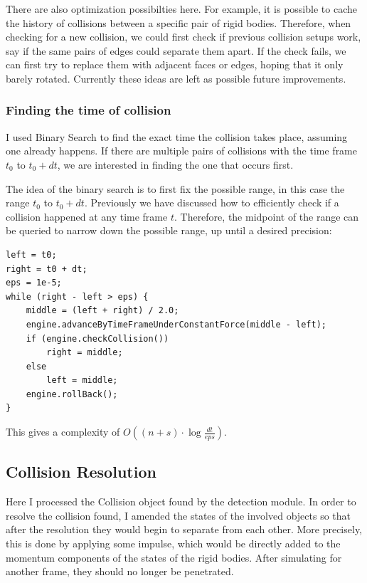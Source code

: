\documentclass[12pt,a4paper,twoside,openright]{report}
\begin{document}
There are also optimization possibilties here. For example, it is possible to cache the history of collisions between a specific pair of rigid bodies. Therefore, when checking for a new collision, we could first check if previous collision setups work, say if the same pairs of edges could separate them apart. If the check fails, we can first try to replace them with adjacent faces or edges, hoping that it only barely rotated. Currently these ideas are left as possible future improvements.

\subsubsection{Finding the time of collision}

I used Binary Search to find the exact time the collision takes place, assuming one already happens. If there are multiple pairs of collisions with the time frame $t_0$ to $t_0 + dt$, we are interested in finding the one that occurs first.

The idea of the binary search is to first fix the possible range, in this case the range $t_0$ to $t_0 + dt$. Previously we have discussed how to efficiently check if a collision happened at any time frame $t$. Therefore, the midpoint of the range can be queried to narrow down the possible range, up until a desired precision:

\begin{verbatim}
left = t0;
right = t0 + dt;
eps = 1e-5;
while (right - left > eps) {
    middle = (left + right) / 2.0;
    engine.advanceByTimeFrameUnderConstantForce(middle - left);
    if (engine.checkCollision())
        right = middle;
    else
        left = middle;
    engine.rollBack();
}
\end{verbatim}

This gives a complexity of $O((n + s) \cdot \log \frac{dt}{eps})$.

\subsection{Collision Resolution}\label{im6}

Here I processed the Collision object found by the detection module. In order to resolve the collision found, I amended the states of the involved objects so that after the resolution they would begin to separate from each other. More precisely, this is done by applying some impulse, which would be directly added to the momentum components of the states of the rigid bodies. After simulating for another frame, they should no longer be penetrated.
\end{document}
